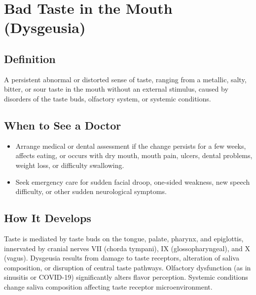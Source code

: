 \chapter{Bad Taste in the Mouth (Dysgeusia)}

\section*{Definition}
A persistent abnormal or distorted sense of taste, ranging from a metallic, salty, bitter, or sour taste in the mouth without an external stimulus, caused by disorders of the taste buds, olfactory system, or systemic conditions.

\section*{When to See a Doctor}

\begin{itemize}
 \item Arrange medical or dental assessment if the change persists for a few weeks, affects eating, or occurs with dry mouth, mouth pain, ulcers, dental problems, weight loss, or difficulty swallowing.
 \item Seek emergency care for sudden facial droop, one-sided weakness, new speech difficulty, or other sudden neurological symptoms.
\end{itemize}

\section*{How It Develops}
Taste is mediated by taste buds on the tongue, palate, pharynx, and epiglottis, innervated by cranial nerves VII (chorda tympani), IX (glossopharyngeal), and X (vagus). Dysgeusia results from damage to taste receptors, alteration of saliva composition, or disruption of central taste pathways. Olfactory dysfunction (as in sinusitis or COVID-19) significantly alters flavor perception. Systemic conditions change saliva composition affecting taste receptor microenvironment.

